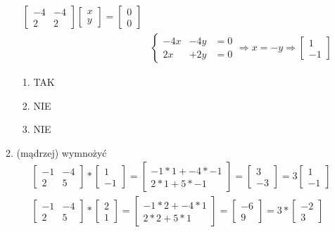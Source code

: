 \documentclass[a4paper,12pt]{article}
\theoremstyle{definition}%
\theoremstyle{definition}
\theoremstyle{problem}
\begin{document}
\begin{enumerate}[label=\alph*)]
\begin{enumerate}[label=\Roman*:]
\begin{align*}
\begin{bmatrix}
-4 & -4\\ 2 & 2
\end{bmatrix} \begin{bmatrix}
x\\y
\end{bmatrix}=\begin{bmatrix}
0\\0
\end{bmatrix}\\
&\left\{\begin{matrix}
-4x &-4y &= 0\\
2x &+ 2y &= 0
\end{matrix}\right. \Rightarrow x=-y \Rightarrow \begin{bmatrix}
1\\-1
\end{bmatrix}
\end{align*}
\begin{enumerate}[label=\alph*)]
\item TAK
\item NIE
\item NIE
\end{enumerate}
\item (mądrzej) wymnożyć
\begin{align*}
&\begin{bmatrix}
-1 & -4\\
2 & 5
\end{bmatrix} * \begin{bmatrix}
1\\-1
\end{bmatrix}=\begin{bmatrix}
-1*1+-4*-1\\
2*1+5*-1
\end{bmatrix}= \begin{bmatrix}
3\\
-3
\end{bmatrix}=3\begin{bmatrix}
1\\-1
\end{bmatrix} \\
& \begin{bmatrix}
-1 & -4\\
2 & 5
\end{bmatrix} * \begin{bmatrix}
2\\1
\end{bmatrix} = \begin{bmatrix}
-1*2+-4*1 \\
2*2+5*1
\end{bmatrix} = \begin{bmatrix}
-6\\
9
\end{bmatrix}=3*\begin{bmatrix}
-2\\3
\end{bmatrix}
\end{align*}


\end{enumerate}
\end{enumerate}
\end{document}
